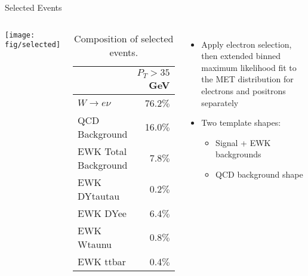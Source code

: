 \documentclass[t, 8pt]{beamer}
\begin{document}
\begin{frame}{Selected Events}
  \begin{columns}[c]
    \texttt{[image: fig/selected]}

  \tiny{
    \begin{center}
    \begin{table}[htbp]
    \begin{tabular}{|l|r|}
    \hline
    & $P_{T}>35$ GeV \\ \hline
    $W\to e\nu$  & 76.2$\%$\\\hline
    QCD Background       & 16.0$\%$\\\hline
    EWK Total Background & 7.8$\%$ \\
    EWK DYtautau         & 0.2$\%$  \\
    EWK DYee             & 6.4$\%$  \\
    EWK Wtaunu           & 0.8$\%$ \\
    EWK ttbar            & 0.4$\%$ \\\hline
    \end{tabular}
    \caption{\label{tab:composition} Composition of selected events.}%
    \end{table}
  \end{center}
  }
  \normalsize

  \begin{itemize}
    \item Apply electron selection, then extended binned maximum likelihood fit to the MET distribution for electrons and positrons separately
    \item Two template shapes:
    \begin{itemize}
      \item Signal + EWK backgrounds 
      \item QCD background shape 
    \end{itemize}
  \end{itemize}

  \end{columns}
\end{frame}
\end{document}
